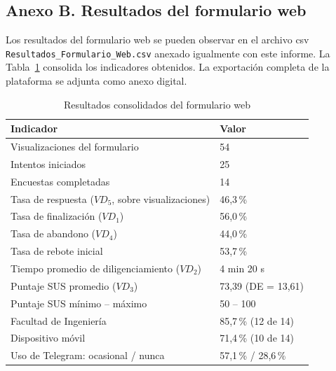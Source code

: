 \documentclass[12pt,letterpaper]{article}
\begin{document}
\subsection*{Anexo B. Resultados del formulario web}

Los resultados del formulario web se pueden observar en el archivo csv \texttt{Resultados\_\allowbreak Formulario\_\allowbreak Web.csv} anexado igualmente con este informe. La Tabla~\ref{tab:anexo-form} consolida los indicadores obtenidos. La exportación completa de la plataforma se adjunta como anexo digital.

\begin{table}[htbp]
\centering
\caption{Resultados consolidados del formulario web}
\label{tab:anexo-form}
\small
\begin{tabular}{|p{8cm}|p{5cm}|}
\hline
\textbf{Indicador} & \textbf{Valor} \\ \hline
Visualizaciones del formulario & 54 \\ \hline
Intentos iniciados & 25 \\ \hline
Encuestas completadas & 14 \\ \hline
Tasa de respuesta ($VD_5$, sobre visualizaciones) & 46,3\,\% \\ \hline
Tasa de finalización ($VD_1$) & 56,0\,\% \\ \hline
Tasa de abandono ($VD_4$) & 44,0\,\% \\ \hline
Tasa de rebote inicial & 53,7\,\% \\ \hline
Tiempo promedio de diligenciamiento ($VD_2$) & 4 min 20 s \\ \hline
Puntaje SUS promedio ($VD_3$) & 73,39 (DE = 13,61) \\ \hline
Puntaje SUS mínimo -- máximo & 50 -- 100 \\ \hline
Facultad de Ingeniería & 85,7\,\% (12 de 14) \\ \hline
Dispositivo móvil & 71,4\,\% (10 de 14) \\ \hline
Uso de Telegram: ocasional / nunca & 57,1\,\% / 28,6\,\% \\ \hline
\end{tabular}
\end{table}
\end{document}
